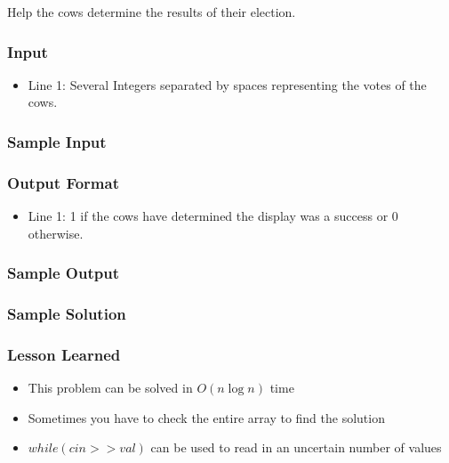 Help the cows determine the results of their election.

\subsubsection{Input}
\begin{itemize}
	\item Line 1: Several Integers separated by spaces representing the votes of the cows.
\end{itemize}

\subsubsection{Sample Input}


\subsubsection{Output Format}
\begin{itemize}
	\item Line 1: 1 if the cows have determined the display was a success or 0 otherwise.
\end{itemize}
\subsubsection{Sample Output}


\subsubsection{Sample Solution}


\subsubsection{Lesson Learned}
\begin{itemize}
	\item This problem can be solved in $O(n \log n)$ time
	\item Sometimes you have to check the entire array to find the solution
	\item $while( cin >> val)$ can be used to read in an uncertain number of values
\end{itemize}
